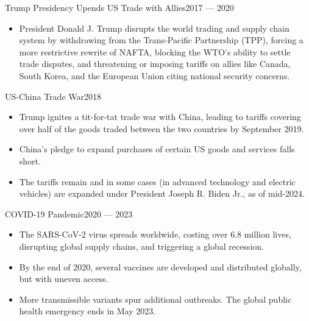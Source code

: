 \documentclass[10pt, aspectratio=169]{beamer}
\begin{document}
	\begin{frame}{Trump Presidency Upends US Trade with Allies}{2017 — 2020}
		\begin{itemize}
			\item President Donald J. Trump disrupts the world trading and supply chain system by withdrawing from the Trans-Pacific Partnership (TPP), forcing a more restrictive rewrite of NAFTA, blocking the WTO’s ability to settle trade disputes, and threatening or imposing tariffs on allies like Canada, South Korea, and the European Union citing national security concerns.
		\end{itemize}
	\end{frame}
	
	\begin{frame}{US-China Trade War}{2018}
		\begin{itemize}
			\item Trump ignites a tit-for-tat trade war with China, leading to tariffs covering over half of the goods traded between the two countries by September 2019.
			\vspace{0.25cm}
			\item China’s pledge to expand purchases of certain US goods and services falls short.
			\vspace{0.25cm}
			\item The tariffs remain and in some cases (in advanced technology and electric vehicles) are expanded under President Joseph R. Biden Jr., as of mid-2024.
		\end{itemize}
	\end{frame}
	
	\begin{frame}{COVID-19 Pandemic}{2020 — 2023}
		\begin{itemize}
			\item The SARS-CoV-2 virus spreads worldwide, costing over 6.8 million lives, disrupting global supply chains, and triggering a global recession.
			\vspace{0.25cm}
			\item By the end of 2020, several vaccines are developed and distributed globally, but with uneven access.
			\vspace{0.25cm}
			\item More transmissible variants spur additional outbreaks. The global public health emergency ends in May 2023.
		\end{itemize}
	\end{frame}
	
\end{document}
